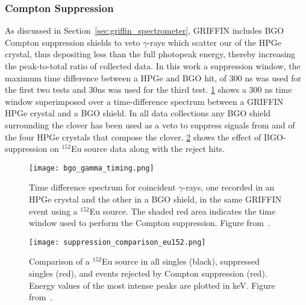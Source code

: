 \documentclass[cnatzke_thesis_proposal.tex]{subfiles}
\begin{document}
\subsubsection{Compton Suppression}
As discussed in Section~\ref{sec:griffin_spectrometer}, GRIFFIN includes BGO Compton suppression shields to veto $\gamma$-rays which scatter our of the HPGe crystal, thus depositing less than the full photopeak energy, thereby increasing the peak-to-total ratio of collected data.
In this work a suppression window, the maximum time difference between a HPGe and BGO hit, of 300 ns was used for the first two tests and 30ns was used for the third test. \ref{fig:bgo_gamma_timing} shows a 300 ns time window superimposed over a time-difference spectrum between a GRIFFIN HPGe crystal and a BGO shield. 
In all data collections any BGO shield surrounding the clover has been used as a veto to suppress signals from and of the four HPGe crystals that compose the clover. 
\ref{fig:suppression_comparison_eu152} shows the effect of BGO-suppression on $^{152}$Eu source data along with the reject hits.

\begin{figure}[htbp]
  \centering
  \texttt{[image: bgo\_gamma\_timing.png]}
  \caption{Time difference spectrum for coincident $\gamma$-rays, one recorded in an HPGe crystal and the other in a BGO shield, in the same GRIFFIN event using a $^{152}$Eu source. The shaded red area indicates the time window used to perform the Compton suppression. Figure from~\cite{porzio_configuration_2021}.}
  \label{fig:bgo_gamma_timing}
\end{figure}

\begin{figure}[htbp]
  \centering
  \texttt{[image: suppression\_comparison\_eu152.png]}
  \caption{Comparison of a $^{152}$Eu source in all singles (black), suppressed singles (red), and events rejected by Compton suppression (red). Energy values of the most intense peaks are plotted in keV. Figure from~\cite{porzio_configuration_2021}.}
  \label{fig:suppression_comparison_eu152}
\end{figure}

\end{document}
